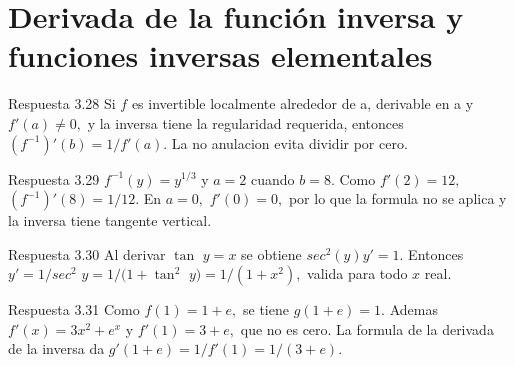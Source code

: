 \documentclass[10pt,a4paper,oneside,openany]{book}
\begin{document}
\section{Derivada de la función inversa y funciones inversas elementales}
\begin{PSevenAnswerFixed}{Respuesta 3.28}
Si \(f\) es invertible localmente alrededor de a, derivable en a y \(f'(a)\ne 0,\) y la inversa tiene la regularidad requerida, entonces \((f^{-1})'(b)=1/f'(a)\). La no anulacion evita dividir por cero.
\end{PSevenAnswerFixed}
\begin{PSevenAnswerFixed}{Respuesta 3.29}
\(f^{-1}(y)=y^{1/3}\) y \(a=2\) cuando \(b=8\). Como \(f'(2)=12,\) \((f^{-1})'(8)=1/12\). En \(a=0,\) \(f'(0)=0,\) por lo que la formula no se aplica y la inversa tiene tangente vertical.
\end{PSevenAnswerFixed}
\begin{PSevenAnswerFixed}{Respuesta 3.30}
Al derivar \(\tan\) \(y=x\) se obtiene \(sec^{2}(y)y'=1\). Entonces \(y'=1/sec^{2}\) \(y=1/(1+\tan^{2}\) \(y)=1/(1+x^{2}),\) valida para todo \(x\) real.
\end{PSevenAnswerFixed}
\begin{PSevenAnswerFixed}{Respuesta 3.31}
Como \(f(1)=1+e,\) se tiene \(g(1+e)=1\). Ademas \(f'(x)=3x^{2}+e^x\) y \(f'(1)=3+e,\) que no es cero. La formula de la derivada de la inversa da \(g'(1+e)=1/f'(1)=1/(3+e)\).
\end{PSevenAnswerFixed}
\end{document}
